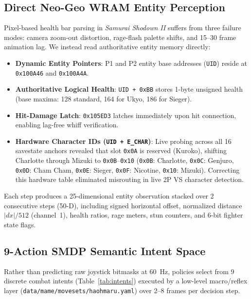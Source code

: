 \documentclass[10pt,twocolumn]{article}
\begin{document}
\subsection{Direct Neo-Geo WRAM Entity Perception}
Pixel-based health bar parsing in \textit{Samurai Shodown II} suffers from three failure modes: camera zoom-out distortion, rage-flash palette shifts, and 15--30 frame animation lag. We instead read authoritative entity memory directly:
\begin{itemize}
    \item \textbf{Dynamic Entity Pointers}: P1 and P2 entity base addresses (\texttt{UID}) reside at \texttt{0x100A46} and \texttt{0x100A4A}.
    \item \textbf{Authoritative Logical Health}: \texttt{UID + 0xBB} stores 1-byte unsigned health (base maxima: 128 standard, 164 for Ukyo, 186 for Sieger).
    \item \textbf{Hit-Damage Latch}: \texttt{0x105ED3} latches immediately upon hit connection, enabling lag-free whiff verification.
    \item \textbf{Hardware Character IDs (\texttt{UID + E\_CHAR})}: Live probing across all 16 savestate anchors revealed that slot \texttt{0x0A} is reserved (Kuroko), shifting Charlotte through Mizuki to \texttt{0x0B}--\texttt{0x10} (\texttt{0x0B}: Charlotte, \texttt{0x0C}: Genjuro, \texttt{0x0D}: Cham Cham, \texttt{0x0E}: Sieger, \texttt{0x0F}: Nicotine, \texttt{0x10}: Mizuki). Correcting this hardware table eliminated misrouting in live 2P VS character detection.
\end{itemize}

Each step produces a 25-dimensional entity observation stacked over 2 consecutive steps (50-D), including signed horizontal offset, normalized distance $|dx|/512$ (channel~1), health ratios, rage meters, stun counters, and 6-bit fighter state flags.

\subsection{9-Action SMDP Semantic Intent Space}
Rather than predicting raw joystick bitmasks at 60~Hz, policies select from 9 discrete combat intents (Table~\ref{tab:intents}) executed by a low-level macro/reflex layer (\texttt{data/mame/movesets/haohmaru.yaml}) over 2--8 frames per decision step.
\end{document}
